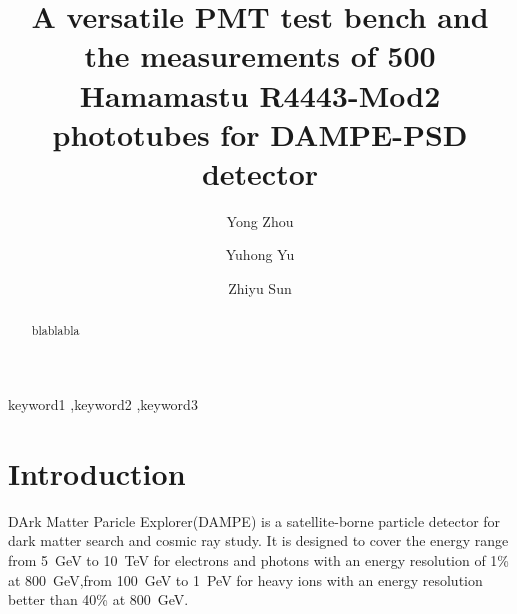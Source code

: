 \documentclass[preprint,5p,times]{elsarticle}
\begin{document}
\begin{frontmatter}

\title{A versatile PMT test bench and the measurements of 500 Hamamastu R4443-Mod2 phototubes for DAMPE-PSD detector}

\author[imp,ucas,lzu]{Yong Zhou}

\author[imp]{Yuhong Yu}

\author[imp]{Zhiyu Sun}


\address[imp]{Institute of Modern Physicas,Chinese Academy of Sciences, 509 Nanchang Road, Lanzhou, 730000, P.R.China}
\address[ucas]{Graduate University of the Chinese Academy of Sciences, 19A Yuquan Road, Beijing, 100049, P.R.China}
\address[lzu]{School of Nuclear Science and Technology, Lanzhou University, 222 South Tianshui Road, Lanzhou, 730000, P.R.China}

\begin{abstract}
blablabla
\end{abstract}

\begin{keyword}
keyword1
\sep keyword2
\sep keyword3



\end{keyword}

\end{frontmatter}

\section{Introduction}
\label{sec:introduction}

DArk Matter Paricle Explorer(DAMPE)\cite{Chang_Jin_dampe} is a satellite-borne particle detector for dark matter search and cosmic ray study.
It is designed to cover the energy range from 5~GeV to 10~TeV for electrons and photons with an energy resolution of 1\% at 800~GeV,from 100~GeV to 1~PeV for heavy ions with an energy resolution better than 40\% at 800~GeV.
\end{document}
